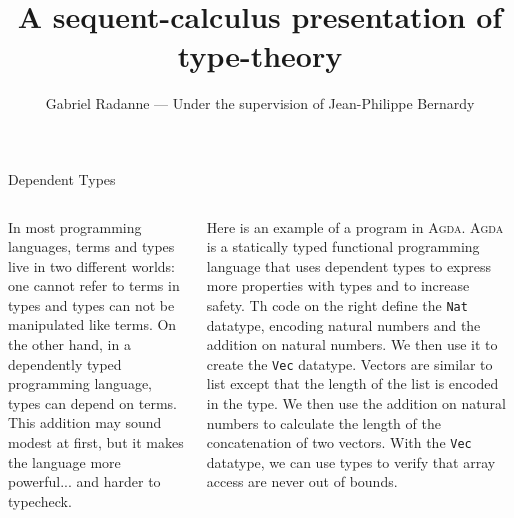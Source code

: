 \documentclass[final, xcolor=svgnames]{beamer}
\title{A sequent-calculus presentation of type-theory}
\author{Gabriel Radanne --- Under the supervision of Jean-Philippe Bernardy}
\institute{ENS Rennes --- Chalmers University of Technology}
\newcommand{\agda}{\textsc{Agda}\xspace}
\begin{document}
\raggedright{}
\begin{frame}[shrink]
  \begin{block}{Dependent Types}
    \begin{columns}[t]
      In most programming languages, terms and types live in two different worlds: one cannot refer to terms in types and types can not be manipulated like terms.
      On the other hand, in a dependently typed programming language, types can depend on terms.
      This addition may sound modest at first, but it makes the language more powerful... and harder to typecheck.

      Here is an example of a program in \agda. \agda is a statically typed functional programming language that uses dependent types to express more properties with types and to increase safety.
      Th code on the right define the \lstinline[language=nanoAgda]{Nat} datatype, encoding natural numbers and the addition on natural numbers.
      We then use it to create the \lstinline[language=nanoAgda]{Vec} datatype. Vectors are similar to list except that the length of the list is encoded in the type. We then use the addition on natural numbers to calculate the length of the concatenation of two vectors.
      With the \lstinline[language=nanoAgda]{Vec} datatype, we can use types to verify that array access are never out of bounds.


\end{columns}
\end{block}
\end{frame}
\end{document}
